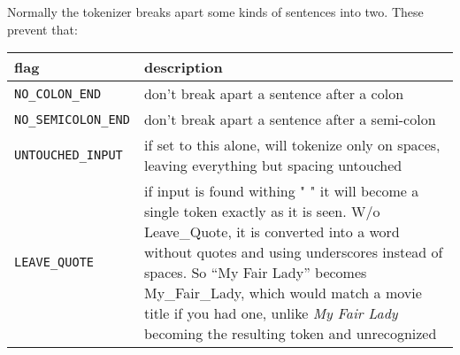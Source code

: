 \documentclass[]{article}
\begin{document}
Normally the tokenizer breaks apart some kinds of sentences into two.
These prevent that:

\begin{longtable}[]{@{}ll@{}}
\toprule
\begin{minipage}[b]{0.07\columnwidth}\raggedright\strut
flag\strut
\end{minipage} & \begin{minipage}[b]{0.10\columnwidth}\raggedright\strut
description\strut
\end{minipage}\tabularnewline
\midrule
\endhead
\begin{minipage}[t]{0.07\columnwidth}\raggedright\strut
\texttt{NO\_COLON\_END}\strut
\end{minipage} & \begin{minipage}[t]{0.10\columnwidth}\raggedright\strut
don't break apart a sentence after a colon\strut
\end{minipage}\tabularnewline
\begin{minipage}[t]{0.07\columnwidth}\raggedright\strut
\texttt{NO\_SEMICOLON\_END}\strut
\end{minipage} & \begin{minipage}[t]{0.10\columnwidth}\raggedright\strut
don't break apart a sentence after a semi-colon\strut
\end{minipage}\tabularnewline
\begin{minipage}[t]{0.07\columnwidth}\raggedright\strut
\texttt{UNTOUCHED\_INPUT}\strut
\end{minipage} & \begin{minipage}[t]{0.10\columnwidth}\raggedright\strut
if set to this alone, will tokenize only on spaces, leaving everything
but spacing untouched\strut
\end{minipage}\tabularnewline
\begin{minipage}[t]{0.07\columnwidth}\raggedright\strut
\texttt{LEAVE\_QUOTE}\strut
\end{minipage} & \begin{minipage}[t]{0.10\columnwidth}\raggedright\strut
if input is found withing " " it will become a single token exactly as
it is seen. W/o Leave\_Quote, it is converted into a word without quotes
and using underscores instead of spaces. So ``My Fair Lady'' becomes
My\_Fair\_Lady, which would match a movie title if you had one, unlike
\emph{My Fair Lady} becoming the resulting token and unrecognized\strut
\end{minipage}\tabularnewline
\bottomrule
\end{longtable}
\end{document}
